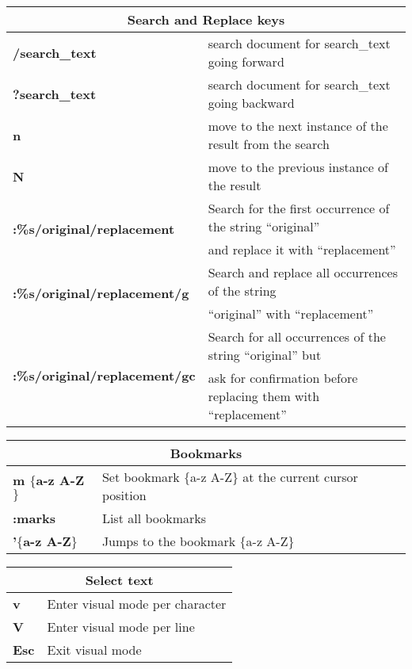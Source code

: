 \begin{table}[h]
\centering
\footnotesize
\begin{tabular}{|l|l|}
\multicolumn{2}{c}{\textbf{Search and Replace keys}}\\
\hline
\textbf{/search\_text}	& {search document for search\_text going forward}\\
\hline
\textbf{?search\_text}	& {search document for search\_text going backward}\\
\hline
\textbf{n} & {move to the next instance of the result from the search}\\
\hline
\textbf{N} & {move to the previous instance of the result}\\
\hline
\multirow{2}{*}{\textbf{:\%s/original/replacement}} & {Search for the first occurrence of the string “original”}\\
& {and replace it with “replacement”}\\
\hline
\multirow{2}{*}{\textbf{:\%s/original/replacement/g}} & {Search and replace all occurrences of the string}\\
& {“original” with “replacement”}\\
\hline
\multirow{2}{*}{\textbf{:\%s/original/replacement/gc}} & {Search for all occurrences of the string “original” but}\\
& {ask for confirmation before replacing them with “replacement”}\\
\hline
\end{tabular}
\end{table}

\begin{table}[h]
\centering
\footnotesize
\begin{tabular}{|l|l|}
\multicolumn{2}{c}{\textbf{Bookmarks}}\\
\hline
\textbf{m $\lbrace$a-z A-Z$\rbrace$} &	{Set bookmark $\lbrace$a-z A-Z$\rbrace$ at the current cursor position}\\
\hline
\textbf{:marks} & {List all bookmarks}\\
\hline
\textbf{'$\lbrace$a-z A-Z$\rbrace$}	 & {Jumps to the bookmark $\lbrace$a-z A-Z$\rbrace$}\\
\hline
\end{tabular}
\end{table}

\begin{table}[h]
\centering
\footnotesize
\begin{tabular}{|l|l|}
\multicolumn{2}{c}{\textbf{Select text}}\\
\hline
\textbf{v} & {Enter visual mode per character}\\
\hline
\textbf{V} & {Enter visual mode per line}\\
\hline
\textbf{Esc} & {Exit visual mode}\\
\hline
\end{tabular}
\end{table}

